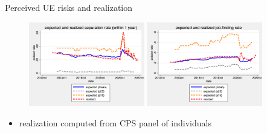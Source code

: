 \documentclass{beamer}
\begin{document}
\begin{frame}{Perceived UE risks and realization}
	\begin{figure}
		\centering
		\label{ue_expectations}
		\includegraphics[width=0.45\textwidth]{figures/separation_rate_1y.png} 
		\hfill
		\includegraphics[width=0.45\textwidth]{figures/job_finding_rate.png} 
	\end{figure}
	\begin{itemize}
		\item realization computed from CPS panel of individuals 
	\end{itemize}
\end{frame}
\end{document}
